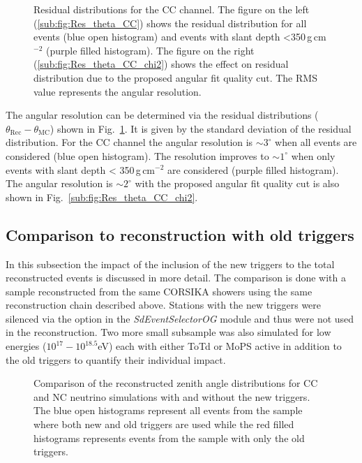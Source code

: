 \begin{figure}[h!]
  \centering
  \hfill
  \caption{Residual distributions for the CC channel. The figure on the left (\ref{sub:fig:Res_theta_CC}) shows the residual distribution for all events (blue open histogram) and events with slant depth <350\,g\,cm$^{-2}$ (purple filled histogram). The figure on the right (\ref{sub:fig:Res_theta_CC_chi2}) shows the effect on residual distribution due to the proposed angular fit quality cut. The RMS value represents the angular resolution.}
  \label{fig:Res_Theta}
\end{figure}

The angular resolution can be determined via the residual distributions ($\theta_{\text{Rec}} - \theta_{\text{MC}}$) shown in Fig.~\ref{fig:Res_Theta}. It is given by the standard deviation of the residual distribution. For the CC channel the angular resolution is $\sim3^{\circ}$ when all events are considered (blue open histogram). The resolution improves to $\sim1^{\circ}$ when only events with slant depth < 350\,g\,cm$^{-2}$ are considered (purple filled histogram). The angular resolution is $\sim2^{\circ}$ with the proposed angular fit quality cut is also shown in Fig.~\ref{sub:fig:Res_theta_CC_chi2}. 
\FloatBarrier
\subsection{Comparison to reconstruction with old triggers}
\label{subsec:old_trig_comp}
In this subsection the impact of the inclusion of the new triggers to the total reconstructed events is discussed in more detail. The comparison is done with a sample reconstructed from the same CORSIKA showers using the same reconstruction chain described above. Stations with the new triggers were silenced via the option in the \textit{SdEventSelectorOG} module and thus were not used in the reconstruction. Two more small subsample was also simulated for low energies ($10^{17}-10^{18.5}$eV) each with either ToTd or MoPS active in addition to the old triggers to quantify their individual impact. 

\begin{figure}[h!]
  \centering
  \hfill
  \caption{Comparison of the reconstructed zenith angle distributions for CC and NC neutrino simulations with and without the new triggers. The blue open histograms represent all events from the sample where both new and old triggers are used while the red filled histograms represents events from the sample with only the old triggers.} 
  \label{fig:Rec_Theta_comp}
\end{figure}

